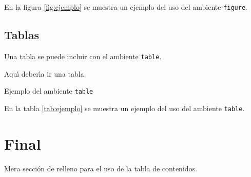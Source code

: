 \documentclass{article}            %
\begin{document}
  En la figura \ref{fig:ejemplo} se muestra un
  ejemplo del uso del ambiente \texttt{figure}.

\subsection{Tablas}

  Una tabla se puede incluir con el ambiente \texttt{table}.

  \begin{table}

   Aqu\'{\i} deber\'{\i}a ir una tabla.

  \caption{Ejemplo del ambiente \texttt{table}}\label{tab:ejemplo}

  \end{table}

  En la tabla \ref{tab:ejemplo} se muestra un
  ejemplo del uso del ambiente \texttt{table}.

\section{Final}

  Mera secci\'on de relleno para el uso de la tabla de
  contenidos.



  \printindex

\end{document}
